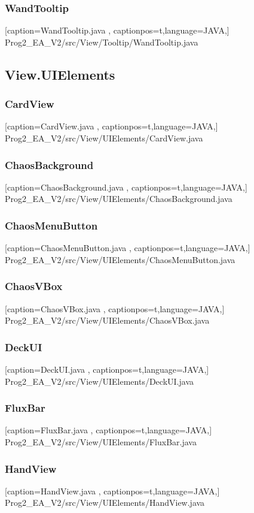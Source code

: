 \documentclass[a4paper,12pt]{scrartcl}
\begin{document}
	\subsubsection{WandTooltip}
	
	[caption={WandTooltip.java}
	\label{lst:javaclass},
	captionpos=t,language=JAVA,]
	{Prog2_EA_V2/src/View/Tooltip/WandTooltip.java}
	\subsection{View.UIElements}
	\subsubsection{CardView}
	
	[caption={CardView.java}
	\label{lst:javaclass},
	captionpos=t,language=JAVA,]
	{Prog2_EA_V2/src/View/UIElements/CardView.java}
	\subsubsection{ChaosBackground}
	
	[caption={ChaosBackground.java}
	\label{lst:javaclass},
	captionpos=t,language=JAVA,]
	{Prog2_EA_V2/src/View/UIElements/ChaosBackground.java}
	\subsubsection{ChaosMenuButton}
	
	[caption={ChaosMenuButton.java}
	\label{lst:javaclass},
	captionpos=t,language=JAVA,]
	{Prog2_EA_V2/src/View/UIElements/ChaosMenuButton.java}
	\subsubsection{ChaosVBox}
	
	[caption={ChaosVBox.java}
	\label{lst:javaclass},
	captionpos=t,language=JAVA,]
	{Prog2_EA_V2/src/View/UIElements/ChaosVBox.java}
	\subsubsection{DeckUI}
	
	[caption={DeckUI.java}
	\label{lst:javaclass},
	captionpos=t,language=JAVA,]
	{Prog2_EA_V2/src/View/UIElements/DeckUI.java}
	\subsubsection{FluxBar}
	
	[caption={FluxBar.java}
	\label{lst:javaclass},
	captionpos=t,language=JAVA,]
	{Prog2_EA_V2/src/View/UIElements/FluxBar.java}
	\subsubsection{HandView}
	
	[caption={HandView.java}
	\label{lst:javaclass},
	captionpos=t,language=JAVA,]
	{Prog2_EA_V2/src/View/UIElements/HandView.java}
\end{document}
